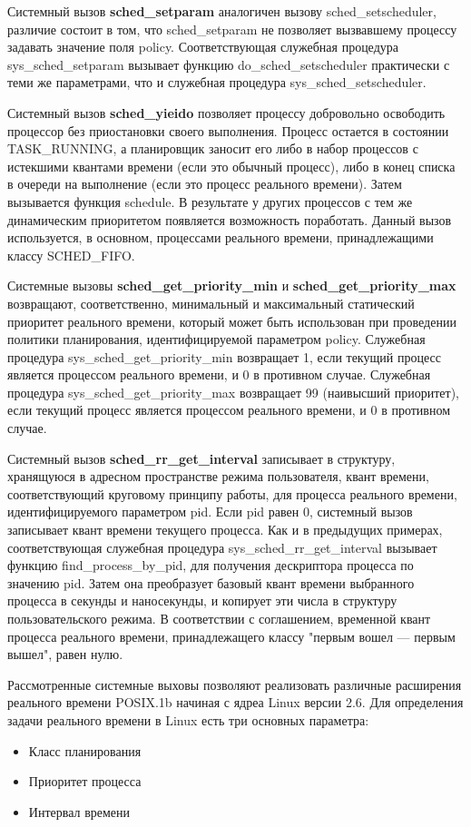 Системный вызов \textbf{sched\_setparam} аналогичен вызову sched\_setscheduler, различие состоит в том, что sched\_setparam не позволяет вызвавшему процессу задавать значение поля policy. Соответствующая служебная процедура sys\_sched\_setparam вызывает функцию do\_sched\_setscheduler практически с теми же параметрами, что и служебная процедура sys\_sched\_setscheduler.

Системный вызов \textbf{sched\_yieido} позволяет процессу добровольно освободить процессор без приостановки своего выполнения. Процесс остается в состоянии TASK\_RUNNING, а планировщик заносит его либо в набор процессов с истекшими квантами времени (если это обычный процесс), либо в конец списка в очереди на выполнение (если это процесс реального времени). Затем вызывается функция schedule. В результате у других процессов с тем же динамическим приоритетом появляется возможность поработать. Данный вызов используется, в основном, процессами реального времени, принадлежащими классу SCHED\_FIFO.

Системные вызовы \textbf{sched\_get\_priority\_min} и \textbf{sched\_get\_priority\_max} возвращают, соответственно, минимальный и максимальный статический приоритет реального времени, который может быть использован при проведении политики планирования, идентифицируемой параметром policy. Служебная процедура sys\_sched\_get\_priority\_min возвращает 1, если текущий процесс является процессом реального времени, и 0 в противном случае. Служебная процедура sys\_sched\_get\_priority\_max возвращает 99 (наивысший приоритет), если текущий процесс является процессом реального времени, и 0 в противном случае.

Системный вызов \textbf{sched\_rr\_get\_interval} записывает в структуру, хранящуюся в адресном пространстве режима пользователя, квант времени, соответствующий круговому принципу работы, для процесса реального времени, идентифицируемого параметром pid. Если pid равен 0, системный вызов записывает квант времени текущего процесса. Как и в предыдущих примерах, соответствующая служебная процедура sys\_sched\_rr\_get\_interval вызывает функцию find\_process\_by\_pid, для получения дескриптора процесса по значению pid. Затем она преобразует базовый квант времени выбранного процесса в секунды и наносекунды, и копирует эти числа в структуру пользовательского режима. В соответствии с соглашением, временной квант процесса реального времени, принадлежащего классу "первым вошел — первым вышел", равен нулю.

Рассмотренные системные выховы позволяют реализовать различные расширения реального времени POSIX.1b начиная с ядреа Linux версии 2.6\cite{Raghavan}. Для определения задачи реального времени в Linux есть три основных параметра:
\begin{itemize}
\item Класс планирования
\item Приоритет процесса
\item Интервал времени
\end{itemize}
 
